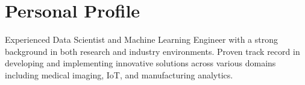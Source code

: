 \section{Personal Profile}
Experienced Data Scientist and Machine Learning Engineer with a strong background in both research and industry environments. Proven track record in developing and implementing innovative solutions across various domains including medical imaging, IoT, and manufacturing analytics.